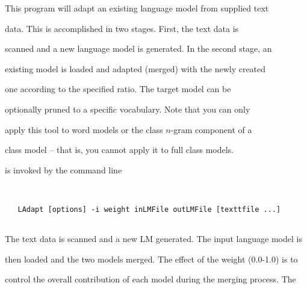 %




%




%





\newpage














This program will adapt an existing language model from supplied text


data.  This is accomplished in two stages. First, the text data is


scanned and a new language model is generated. In the second stage, an


existing model is loaded and adapted (merged) with the newly created


one according to the specified ratio.  The target model can be


optionally pruned to a specific vocabulary.  Note that you can only


apply this tool to word models or the class $n$-gram component of a


class model -- that is, you cannot apply it to full class models.










 is invoked by the command line


\begin{verbatim}


   LAdapt [options] -i weight inLMFile outLMFile [texttfile ...]


\end{verbatim}


The text data is scanned and a new LM generated. The input language model is


then loaded and the two models merged. The effect of the weight (0.0-1.0) is to


control the overall contribution of each model during the merging process. The


